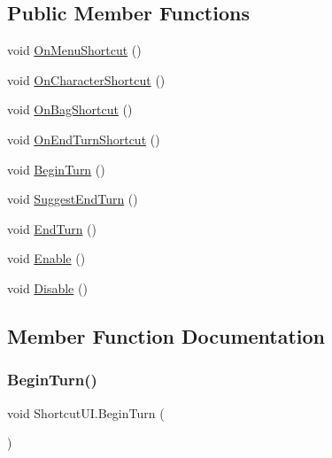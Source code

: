 \subsection*{Public Member Functions}
\begin{DoxyCompactItemize}
\item 
void \mbox{\hyperlink{class_shortcut_u_i_a71824a1037ebef08af0938c0d731a498}{On\+Menu\+Shortcut}} ()
\item 
void \mbox{\hyperlink{class_shortcut_u_i_aa9dca9d0598a36d8df6555d26e75f176}{On\+Character\+Shortcut}} ()
\item 
void \mbox{\hyperlink{class_shortcut_u_i_a2434bf0b041a115161fda12022d69f0b}{On\+Bag\+Shortcut}} ()
\item 
void \mbox{\hyperlink{class_shortcut_u_i_ac6c1705acfb6d8393f36a73810d94958}{On\+End\+Turn\+Shortcut}} ()
\item 
void \mbox{\hyperlink{class_shortcut_u_i_af20cdb51997f4ae7219a36a7bca851a3}{Begin\+Turn}} ()
\item 
void \mbox{\hyperlink{class_shortcut_u_i_a501d7c10166dca42125d04c805c617d1}{Suggest\+End\+Turn}} ()
\item 
void \mbox{\hyperlink{class_shortcut_u_i_ab2181e3a43736c065ce2ff0d8066903e}{End\+Turn}} ()
\item 
void \mbox{\hyperlink{class_shortcut_u_i_ae39ab7b830aff78693a4ddbaa3c59c3e}{Enable}} ()
\item 
void \mbox{\hyperlink{class_shortcut_u_i_a00f6fd2d64d2e5e978b749eafbe8f949}{Disable}} ()
\end{DoxyCompactItemize}


\subsection{Member Function Documentation}
\mbox{\label{class_shortcut_u_i_af20cdb51997f4ae7219a36a7bca851a3}} 
\subsubsection{\texorpdfstring{BeginTurn()}{BeginTurn()}}
{\footnotesize\ttfamily void Shortcut\+U\+I.\+Begin\+Turn (\begin{DoxyParamCaption}{ }\end{DoxyParamCaption})}

